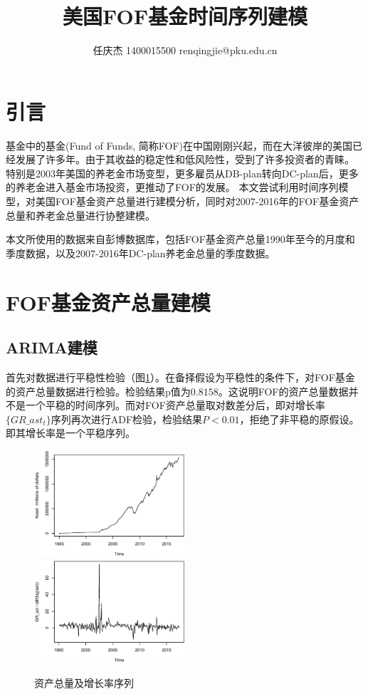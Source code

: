 \documentclass[10.5pt,onecolumn,a4paper]{article}%
\author{任庆杰 1400015500   renqingjie@pku.edu.cn}
\title{美国FOF基金时间序列建模}
\begin{document}
\maketitle{}
\section{引言}
基金中的基金(Fund of Funds, 简称FOF)在中国刚刚兴起，而在大洋彼岸的美国已经发展了许多年。由于其收益的稳定性和低风险性，受到了许多投资者的青睐。
特别是2003年美国的养老金市场变型，更多雇员从DB-plan转向DC-plan后，更多的养老金进入基金市场投资，更推动了FOF的发展。
本文尝试利用时间序列模型，对美国FOF基金资产总量进行建模分析，同时对2007-2016年的FOF基金资产总量和养老金总量进行协整建模。

本文所使用的数据来自彭博数据库，包括FOF基金资产总量1990年至今的月度和季度数据，以及2007-2016年DC-plan养老金总量的季度数据。

\section{FOF基金资产总量建模}
\subsection{ARIMA建模}
首先对数据进行平稳性检验（图\ref{fg:adf1}）。在备择假设为平稳性的条件下，对FOF基金的资产总量数据进行检验。检验结果p值为$0.8158$。这说明FOF的资产总量数据并不是一个平稳的时间序列。而对FOF资产总量取对数差分后，即对增长率$\{GR\_ast_t\}$序列再次进行ADF检验，检验结果$P<0.01$，拒绝了非平稳的原假设。即其增长率是一个平稳序列。

\begin{figure}
    \caption{资产总量及增长率序列} \label{fg:adf1}
	\includegraphics[width=0.5\textwidth]{pic/ast.eps}
	\includegraphics[width=0.5\textwidth]{pic/gr_ast.eps}
\end{figure}
\end{document}

